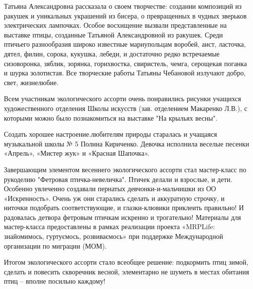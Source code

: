 Татьяна Александровна рассказала о своем творчестве: создании композиций из
ракушек и уникальных украшений из бисера, о превращенных в чудных зверьков
электрических лампочках. Особое восхищение вызвали представленные на выставке
птицы, созданные Татьяной Александровной из ракушек. Среди птичьего
разнообразия широко известные мариупольцам воробей, аист, ласточка, дятел,
филин, сорока, кукушка, лебеди, и достаточно редко встречаемые сизоворонка,
зяблик, зорянка, горихвостка, свиристель, чемга, серощекая поганка и шурка
золотистая. Все творческие работы Татьяны Чебановой излучают добро, свет,
жизнелюбие.

Всем участникам экологического ассорти очень понравились рисунки учащихся
художественного отделения Школы искусств (зав. отделением Макаренко Л.В.), с
которыми можно было познакомиться на выставке "На крыльях весны". 

Создать хорошее настроение.любителям природы старалась и учащаяся музыкальной
школы № 5 Полина Кириченко. Девочка исполнила веселые песенки «Апрель», «Мистер
жук» и «Красная Шапочка».

Завершающим элементом весеннего экологического ассорти стал мастер-класс по
рукоделию  "Фетровая птичка-невеличка". Птичек делали и взрослые, и дети.
Особенно увлеченно создавали пернатых девчонки-и-мальчишки из ОО «Искренность».
Очень уж они старались сделать и аккуратную строчку, и ниточки подобрать
соответствующие, и глазки-клювики приклеить правильно! И радовалась детвора
фетровым птичкам искренно и трогательно! Материалы для мастер-класса
предоставлены в рамках реализации проекта «MRPLife: знайомимось, гуртуємось,
розвиваємось» при поддержке Международной организации по миграции (МОМ).

Итогом экологического ассорти стало всеобщее решение: подкормить птиц зимой,
сделать и повесить скворечник весной, элементарно не шуметь в местах обитания
птиц – вполне посильно каждому!
